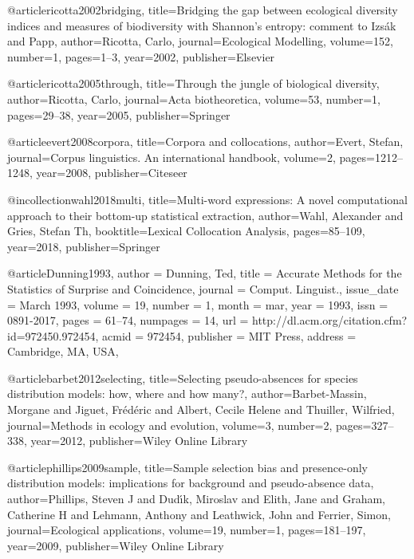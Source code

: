 {{{{@article{ricotta2002bridging,
  title={Bridging the gap between ecological diversity indices and measures of biodiversity with Shannon's entropy: comment to Izs{\'a}k and Papp},
  author={Ricotta, Carlo},
  journal={Ecological Modelling},
  volume={152},
  number={1},
  pages={1--3},
  year={2002},
  publisher={Elsevier}
}


@article{ricotta2005through,
  title={Through the jungle of biological diversity},
  author={Ricotta, Carlo},
  journal={Acta biotheoretica},
  volume={53},
  number={1},
  pages={29--38},
  year={2005},
  publisher={Springer}
}



@article{evert2008corpora,
  title={Corpora and collocations},
  author={Evert, Stefan},
  journal={Corpus linguistics. An international handbook},
  volume={2},
  pages={1212--1248},
  year={2008},
  publisher={Citeseer}
}


@incollection{wahl2018multi,
  title={Multi-word expressions: A novel computational approach to their bottom-up statistical extraction},
  author={Wahl, Alexander and Gries, Stefan Th},
  booktitle={Lexical Collocation Analysis},
  pages={85--109},
  year={2018},
  publisher={Springer}
}


@article{Dunning1993,
 author = {Dunning, Ted},
 title = {Accurate Methods for the Statistics of Surprise and Coincidence},
 journal = {Comput. Linguist.},
 issue_date = {March 1993},
 volume = {19},
 number = {1},
 month = mar,
 year = {1993},
 issn = {0891-2017},
 pages = {61--74},
 numpages = {14},
 url = {http://dl.acm.org/citation.cfm?id=972450.972454},
 acmid = {972454},
 publisher = {MIT Press},
 address = {Cambridge, MA, USA},
 }

@article{barbet2012selecting,
  title={Selecting pseudo-absences for species distribution models: how, where and how many?},
  author={Barbet-Massin, Morgane and Jiguet, Fr{\'e}d{\'e}ric and Albert, Cecile Helene and Thuiller, Wilfried},
  journal={Methods in ecology and evolution},
  volume={3},
  number={2},
  pages={327--338},
  year={2012},
  publisher={Wiley Online Library}
}


@article{phillips2009sample,
  title={Sample selection bias and presence-only distribution models: implications for background and pseudo-absence data},
  author={Phillips, Steven J and Dud{\'\i}k, Miroslav and Elith, Jane and Graham, Catherine H and Lehmann, Anthony and Leathwick, John and Ferrier, Simon},
  journal={Ecological applications},
  volume={19},
  number={1},
  pages={181--197},
  year={2009},
  publisher={Wiley Online Library}
}


}}}}
